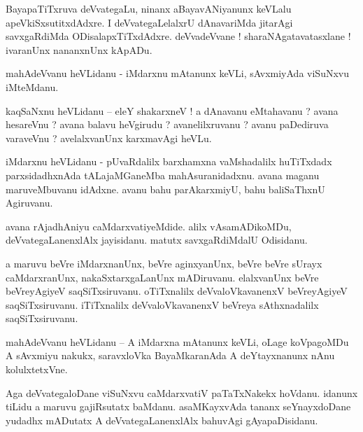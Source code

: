 \documentclass{article}
\begin{document}
\begin{mn}%
BayapaTiTxruva deVvategaLu, ninanx aBayavANiyanunx keVLalu apeVkiSxsutitxdAdxre. I 
deVvategaLelalxrU dAnavariMda jitarAgi savxgaRdiMda ODisalapxTiTxdAdxre. deVvadeVvane ! 
sharaNAgatavatasxlane ! ivaranUnx nananxnUnx kApADu.
\end{mn}

\begin{mn}%
mahAdeVvanu heVLidanu - iMdarxnu mAtanunx keVLi, sAvxmiyAda viSuNxvu iMteMdanu.
\end{mn}

\begin{mn}%
kaqSaNxnu heVLidanu -- eleY shakarxneV ! a dAnavanu eMtahavanu ? avana hesareVnu ? avana balavu 
heVgirudu ? avanelilxruvanu ? avanu paDediruva varaveVnu ? avelalxvanUnx karxmavAgi heVLu.
\end{mn}

\begin{mn}%
iMdarxnu heVLidanu - pUvaRdalilx barxhamxna vaMshadalilx huTiTxdadx parxsidadhxnAda tALajaMGaneMba 
mahAsuranidadxnu. avana maganu maruveMbuvanu idAdxne. avanu bahu parAkarxmiyU, bahu baliSaThxnU 
Agiruvanu.
\end{mn}

\begin{mn}%
avana rAjadhAniyu caMdarxvatiyeMdide. alilx vAsamADikoMDu, deVvategaLanenxlAlx jayisidanu. matutx 
savxgaRdiMdalU Odisidanu.
\end{mn}

\begin{mn}%
a maruvu beVre iMdarxnanUnx, beVre aginxyanUnx, beVre beVre sUrayx caMdarxranUnx, 
nakaSxtarxgaLanUnx mADiruvanu. elalxvanUnx beVre beVreyAgiyeV saqSiTxsiruvanu. oTiTxnalilx 
deVvaloVkavanenxV beVreyAgiyeV saqSiTxsiruvanu. iTiTxnalilx deVvaloVkavanenxV beVreya 
sAthxnadalilx saqSiTxsiruvanu.
\end{mn}

\begin{mn}%
mahAdeVvanu heVLidanu -- A iMdarxna mAtanunx keVLi, oLage koVpagoMDu A sAvxmiyu nakukx, saravxloVka 
BayaMkaranAda A deYtayxnanunx nAnu kolulxtetxVne.
\end{mn}

\begin{mn}%
Aga deVvategaloDane viSuNxvu caMdarxvatiV paTaTxNakekx hoVdanu. idanunx tiLidu a maruvu gajiRsutatx 
baMdanu. asaMKayxvAda tananx seYnayxdoDane yudadhx mADutatx A deVvategaLanenxlAlx bahuvAgi 
gAyapaDisidanu.
\end{mn}
\end{document}
